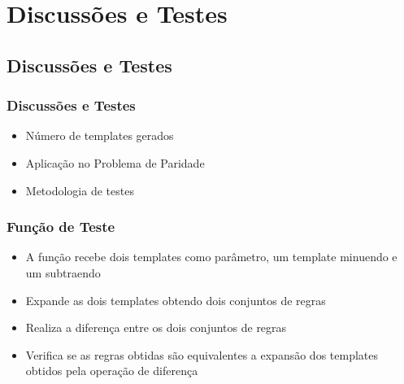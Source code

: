 \documentclass[aspectratio=43,hyperref={pdfpagelabels=false}]{beamer}
\begin{document}
 \section{Discussões e Testes}
 \subsection*{Discussões e Testes}
 \begin{frame}
     \frametitle{Discussões e Testes}
     \begin{itemize}
      \item Número de templates gerados
      \item Aplicação no Problema de Paridade
      \item Metodologia de testes
     \end{itemize}
 \end{frame}

\begin{frame}
    \frametitle{Função de Teste}

    \begin{itemize}
           \item A função recebe dois templates como parâmetro, um template minuendo e um subtraendo
           \item Expande as dois templates obtendo dois conjuntos de regras
           \item Realiza a diferença entre os dois conjuntos de regras
           \item Verifica se as regras obtidas são equivalentes a expansão dos templates obtidos pela operação de diferença
     \end{itemize}
\end{frame}
\end{document}
